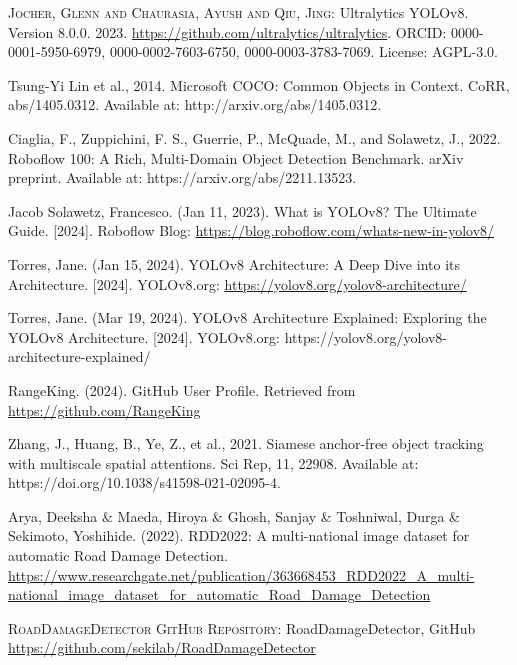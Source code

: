 \begin{thebibliography}{10}
        \textsc{Jocher, Glenn and Chaurasia, Ayush and Qiu, Jing}:
        Ultralytics YOLOv8.
        Version 8.0.0.
        2023.
        \url{https://github.com/ultralytics/ultralytics}.
        \textsc{ORCID}: 0000-0001-5950-6979, 0000-0002-7603-6750, 0000-0003-3783-7069.
        License: AGPL-3.0.

        Tsung-Yi Lin et al., 2014. Microsoft COCO: Common Objects in Context. CoRR, abs/1405.0312. Available at: http://arxiv.org/abs/1405.0312.

        Ciaglia, F., Zuppichini, F. S., Guerrie, P., McQuade, M., and Solawetz, J., 2022. Roboflow 100: A Rich, Multi-Domain Object Detection Benchmark. arXiv preprint. Available at: https://arxiv.org/abs/2211.13523.

        Jacob Solawetz, Francesco. (Jan 11, 2023). What is YOLOv8? The Ultimate Guide. [2024]. Roboflow Blog: \url{https://blog.roboflow.com/whats-new-in-yolov8/}

        Torres, Jane. (Jan 15, 2024). YOLOv8 Architecture: A Deep Dive into its Architecture. [2024]. YOLOv8.org: \url{https://yolov8.org/yolov8-architecture/}

        Torres, Jane. (Mar 19, 2024). YOLOv8 Architecture Explained: Exploring the YOLOv8 Architecture. [2024]. YOLOv8.org: https://yolov8.org/yolov8-architecture-explained/

        RangeKing. (2024). GitHub User Profile.
        Retrieved from \url{https://github.com/RangeKing}

        Zhang, J., Huang, B., Ye, Z., et al., 2021. Siamese anchor-free object tracking with multiscale spatial attentions. Sci Rep, 11, 22908. Available at: https://doi.org/10.1038/s41598-021-02095-4.

        Arya, Deeksha \& Maeda, Hiroya \& Ghosh, Sanjay \& Toshniwal, Durga \& Sekimoto, Yoshihide. (2022). RDD2022: A multi-national image dataset for automatic Road Damage Detection. 
        \url{https://www.researchgate.net/publication/363668453_RDD2022_A_multi-national_image_dataset_for_automatic_Road_Damage_Detection}

        \textsc{RoadDamageDetector GitHub Repository}:
        RoadDamageDetector, GitHub
        \url{https://github.com/sekilab/RoadDamageDetector}


\end{thebibliography}

